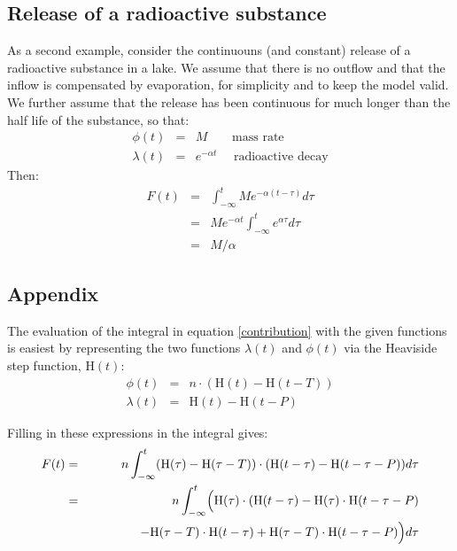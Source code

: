 \documentclass[onecolumn]{article}
\begin{document}
\subsection*{Release of a radioactive substance}

As a second example, consider the continuouns (and constant) release of a radioactive substance in a lake.
We assume that there is no outflow and that the inflow is compensated by evaporation, for simplicity and
to keep the model valid. We further assume that the release has been continuous for much longer than the
half life of the substance, so that:
\begin{eqnarray}
    \phi(t)    &=& M ~~~~~~~~~ \textrm{mass rate} \\
    \lambda(t) &=& e^{-\alpha t} ~~~~~~ \textrm{radioactive decay}
\end{eqnarray}
Then:
\begin{eqnarray}
          F(t) &=& \int^t_{-\infty} M e^{- \alpha (t-\tau)} d\tau          \\
\nonumber      &=& M e^{- \alpha t} \int^t_{-\infty} e^{\alpha \tau} d\tau \\
\nonumber      &=& M / \alpha
\end{eqnarray}


\subsection*{Appendix}
The evaluation of the integral in equation \ref{contribution} with the given functions is easiest by representing the
two functions $\lambda(t)$ and $\phi(t)$ via the Heaviside step function, $\textrm{H}(t)$:
%
\begin{eqnarray}
\nonumber    \phi(t)    &=& n \cdot (\textrm{H}(t) - \textrm{H}(t-T)) \\
\nonumber    \lambda(t) &=& \textrm{H}(t) - \textrm{H}(t-P)
\end{eqnarray}

Filling in these expressions in the integral gives:
\begin{eqnarray}
             F(t) &=& n \int_{-\infty}^t (\textrm{H}(\tau) - \textrm{H}(\tau-T)) \cdot (\textrm{H}(t - \tau) - \textrm{H}(t - \tau-P)) d\tau \\
\nonumber         &=& n \int_{-\infty}^t \Bigl( \textrm{H}(\tau) \cdot (\textrm{H}(t - \tau) - \textrm{H}(\tau) \cdot \textrm{H}(t - \tau - P) \\
\nonumber         & & ~~~~~~~~~~~~ - \textrm{H}(\tau-T) \cdot \textrm{H}(t - \tau) + \textrm{H}(\tau-T) \cdot \textrm{H}(t - \tau-P) \Bigr) d\tau
\end{eqnarray}
\end{document}
